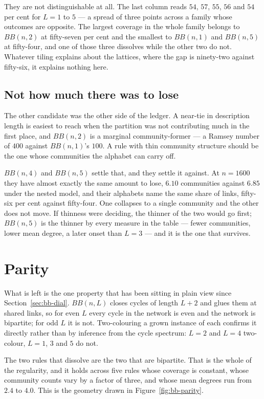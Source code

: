 They are not distinguishable at all. The last column reads $54$, $57$, $55$, $56$
and $54$ per cent for $L=1$ to $5$ --- a spread of three points across a family
whose outcomes are opposite. The largest coverage in the whole family belongs to
$BB(n,2)$ at fifty-seven per cent and the smallest to $BB(n,1)$ and $BB(n,5)$ at
fifty-four, and one of those three dissolves while the other two do not. Whatever
tiling explains about the lattices, where the gap is ninety-two against
fifty-six, it explains nothing here.

\subsection*{Not how much there was to lose}

The other candidate was the other side of the ledger. A near-tie in description
length is easiest to reach when the partition was not contributing much in the
first place, and $BB(n,2)$ is a marginal community-former --- a Ramsey number of
$400$ against $BB(n,1)$'s $100$. A rule with thin community structure should be
the one whose communities the alphabet can carry off.

$BB(n,4)$ and $BB(n,5)$ settle that, and they settle it against. At $n=1600$ they
have almost exactly the same amount to lose, $6.10$ communities against $6.85$
under the nested model, and their alphabets name the same share of links, fifty-six
per cent against fifty-four. One collapses to a single community and the other
does not move. If thinness were deciding, the thinner of the two would go first;
$BB(n,5)$ is the thinner by every measure in the table --- fewer communities,
lower mean degree, a later onset than $L=3$ --- and it is the one that survives.

\section{Parity}
\label{sec:bb-parity}

What is left is the one property that has been sitting in plain view since
Section~\ref{sec:bb-dial}. $BB(n,L)$ closes cycles of length $L+2$ and glues
them at shared links, so for even $L$ every cycle in the network is even and the
network is bipartite; for odd $L$ it is not. Two-colouring a grown instance of
each confirms it directly rather than by inference from the cycle spectrum: $L=2$
and $L=4$ two-colour, $L=1$, $3$ and $5$ do not.

The two rules that dissolve are the two that are bipartite. That is the whole of
the regularity, and it holds across five rules whose coverage is constant, whose
community counts vary by a factor of three, and whose mean degrees run from $2.4$
to $4.0$. This is the geometry drawn in Figure~\ref{fig:bb-parity}.


